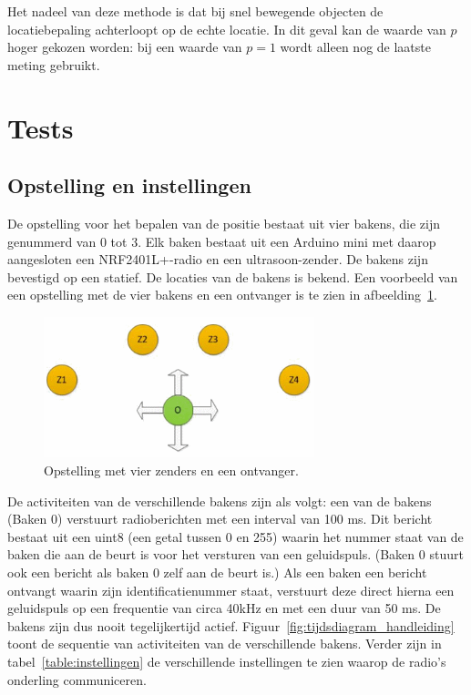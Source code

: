 \documentclass[a4paper,10pt]{article}
\begin{document}
Het nadeel van deze methode is dat bij snel bewegende objecten de locatiebepaling achterloopt op de echte locatie. In dit geval kan de waarde van $p$ hoger gekozen worden: bij een waarde van $p = 1$ wordt alleen nog de laatste meting gebruikt.

\section{Tests}\label{sec:tests}
\subsection{Opstelling en instellingen}\label{sec:opstelling}
De opstelling voor het bepalen van de positie bestaat uit vier bakens, die zijn genummerd van 0 tot 3. Elk baken bestaat uit een Arduino mini met daarop aangesloten een NRF2401L+-radio en een ultrasoon-zender. De bakens zijn bevestigd op een statief. De locaties van de bakens is bekend. Een voorbeeld van een opstelling met de vier bakens en een ontvanger is te zien in afbeelding~\ref{fig:opstelling}.

\begin{figure}[ht!]
    \centering
    \includegraphics[width=0.7\textwidth]{opstelling.png}
    \caption{Opstelling met vier zenders en een ontvanger.}
    \label{fig:opstelling}
\end{figure}

De activiteiten van de verschillende bakens zijn als volgt: een van de bakens (Baken 0) verstuurt radioberichten met een interval van 100 ms. Dit bericht bestaat uit een uint8 (een getal tussen 0 en 255) waarin het nummer staat van de baken die aan de beurt is voor het versturen van een geluidspuls. (Baken 0 stuurt ook een bericht als baken 0 zelf aan de beurt is.) Als een baken een bericht ontvangt waarin zijn identiﬁcatienummer staat, verstuurt deze direct hierna een geluidspuls op een frequentie van circa 40kHz en met een duur van 50 ms. De bakens zijn dus nooit tegelijkertijd actief. Figuur~\ref{fig:tijdsdiagram_handleiding} toont de sequentie van activiteiten van de verschillende bakens. Verder zijn in tabel~\ref{table:instellingen} de verschillende instellingen te zien waarop de radio’s onderling communiceren.
\end{document}
